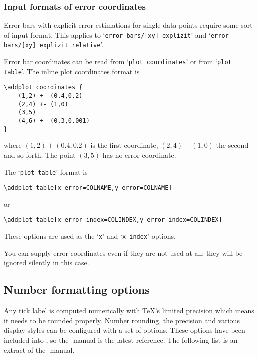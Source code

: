 {\subsubsection{Input formats of error coordinates}
\label{sec:errorbar:input}%
Error bars with explicit error estimations for single data points require some sort of input format. This applies to `\texttt{error bars/[xy] explizit}' and `\texttt{error bars/[xy] explizit relative}'.

Error bar coordinates can be read from `\texttt{plot coordinates}' or from `\texttt{plot table}'. The inline plot coordinates format is
\begin{lstlisting}
\addplot coordinates {
	(1,2) +- (0.4,0.2)
	(2,4) +- (1,0)
	(3,5)
	(4,6) +- (0.3,0.001)
}
\end{lstlisting}
where $(1,2) \pm (0.4,0.2)$ is the first coordinate, $(2,4) \pm (1,0)$ the second and so forth. The point $(3,5)$ has no error coordinate.

The `\texttt{plot table}' format is
\begin{lstlisting}
\addplot table[x error=COLNAME,y error=COLNAME]
\end{lstlisting}
or
\begin{lstlisting}
\addplot table[x error index=COLINDEX,y error index=COLINDEX]
\end{lstlisting}
These options are used as the `\texttt{x}' and `\texttt{x index}' options.

You can supply error coordinates even if they are not used at all; they will be ignored silently in this case.

}%

\subsection{Number formatting options}
\begingroup
\def\examplenumbers{%
	4.568,5e-04,0.1,24415.98123,123456.12345%
}%
\def\showexamplenumberswith#1{%
	\expandafter\showexamplenumberswithXX\expandafter{\examplenumbers}{#1}{#1}%
}%
\def\showexamplenumberswithFORMATTED#1#2{%
	\expandafter\showexamplenumberswithXX\expandafter{\examplenumbers}{#1}{#2}%
}%
\def\showexamplenumberswithXX#1#2#3{{%
	\small
	\noindent Example:

	\noindent
	{\ttfamily\textbackslash pgfkeys\{/pgf/number format/.cd,#3\}\par\noindent
	\foreach \x in {#1} {%
		\textbackslash pgfmathprintnumber\{\x\}\par\noindent
	}%
	}%
	 leads to 
	\pgfkeys{/pgf/number format/.cd,#2}%
	\foreach \x in {#1} {\pgfmathprintnumber{\x}\hspace{1em}}\unskip.
}}%
\label{sec:number:printing}%
Any tick label is computed numerically with \TeX's limited precision which means it needs to be rounded properly. Number rounding, the precision and various display styles can be configured with a set of options. These options have been included into \PGF, so the \PGF-manual is the latest reference. The following list is an extract of the \PGF-manual.

